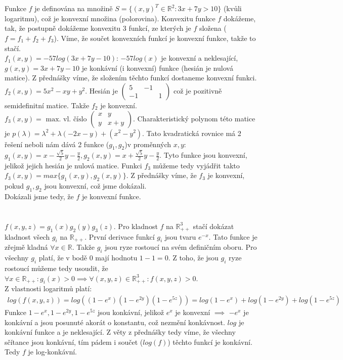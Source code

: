\documentclass[12pt, a4paper]{article}
\begin{document}
\section{}
Funkce $f$ je definována na množině $S = \{(x,y)^T \in \mathbb{R}^2: 3x+7y>10\}$ (kvůli logaritmu), což je konvexní množina (polorovina). Konvexitu funkce $f$ dokážeme, tak, že postupně dokážeme konvexitu 3 funkcí, ze kterých je $f$ složena ($f = f_1 + f_2 + f_3$). Víme, že součet konvexních funkcí je konvexní funkce, takže to stačí.\\
$f_1(x,y) = -57log(3x+7y-10)$: $-57log(x)$ je konvexní a neklesající, $g(x,y) = 3x+7y-10$ je konkávní (i konvexní) funkce (hesián je nulová matice). Z přednášky víme, že složením těchto funkcí dostaneme konvexní funkci.\\
$f_2(x,y) = 5x^2-xy+y^2$. Hesián je $\begin{pmatrix}
5 & -1\\
-1 && 1
\end{pmatrix}$
což je pozitivně semidefinitní matice. Takže $f_2$ je konvexní.
$f_3(x,y) = \text{ max. vl. číslo } \begin{pmatrix}
x & y\\
y & x+y
\end{pmatrix}$. Charakteristický polynom této matice je $p(\lambda)=\lambda^2 + \lambda(-2x-y) + (x^2-y^2)$. Tato kvadratická rovnice má 2 řešení neboli nám dává 2 funkce ($g_1,g_2$)v proměnných $x,y$: $g_1(x,y)=x-\frac{\sqrt{5}}{2}y-\frac{y}{2}, g_2(x,y)=x+\frac{\sqrt{5}}{2}y-\frac{y}{2}$. Tyto funkce jsou konvexní, jelikož jejich hesián je nulová matice. Funkci $f_3$ můžeme tedy vyjádřit takto $f_3(x,y)=max\{g_1(x,y),g_2(x,y)\}$. Z přednášky víme, že $f_3$ je konvexní, pokud $g_1,g_2$ jsou konvexní, což jsme dokázali.\\
Dokázali jsme tedy, že $f$ je konvexní funkce.

\section{}
$f(x,y,z) = g_1(x)g_2(y)g_3(z)$. Pro kladnost $f$ na $\mathbb{R}^3_{++}$ stačí dokázat kladnost všech $g_i$ na $\mathbb{R}_{++}$. První derivace funkcí $g_i$ jsou tvaru $e^{-x}$. Tato funkce je zřejmě kladná $\forall x \in \mathbb{R}$. Takže $g_i$ jsou ryze rostoucí na svém definičním oboru. Pro všechny $g_i$ platí, že v bodě $0$ mají hodnotu $1-1=0$. Z toho, že jsou $g_i$ ryze rostoucí můžeme tedy usoudit, že $\forall x \in \mathbb{R}_{++}: g_i(x)>0 \implies \forall (x,y,z) \in \mathbb{R}^3_{++}: f(x,y,z)>0$.\\
Z vlastnosti logaritmů platí:
\begin{gather*}
log(f(x,y,z))=log((1-e^x)(1-e^{2y})(1-e^{5z}))=log(1-e^x)+log(1-e^{2y})+log(1-e^{5z})
\end{gather*}
Funkce $1-e^x, 1-e^{2y}, 1-e^{5z}$ jsou konkávní, jelikož $e^x$ je konvexní $\implies$ $-e^x$ je konkávní a jsou posunuté akorát o konstantu, což nezmění konkávnost. $log$ je konkávní funkce a je neklesající. Z věty z přednášky tedy víme, že všechny sčítance jsou konkávní, tím pádem i součet ($log(f)$) těchto funkcí je konkávní. Tedy $f$ je log-konkávní.

\section{}
\end{document}
